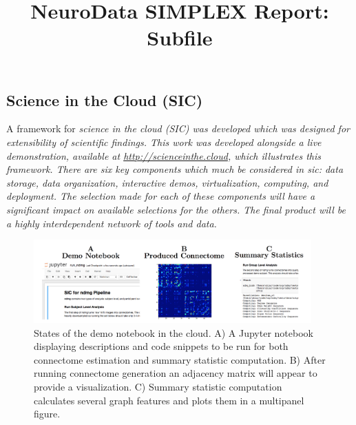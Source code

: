 \documentclass[simplex.tex]{subfiles}
\title{NeuroData SIMPLEX Report: Subfile}
\begin{document}

\subsection{Science in the Cloud (SIC)}

A framework for \itshape{science in the cloud} (SIC) was developed which was
designed for extensibility of scientific findings. This work was
developed alongside a live demonstration, available at
\href{http://scienceinthe.cloud}{http://scienceinthe.cloud}, which illustrates this framework. There are
six key components which much be considered in sic: data storage, data
organization, interactive demos, virtualization, computing, and
deployment. The selection made for each of these components will have a
significant impact on available selections for the others. The final
product will be a highly interdependent network of tools and data.

\begin{figure}[h!]
\begin{cframed}
\centering
\includegraphics[width=0.95\textwidth]{./figs/sic.png}
\caption{
  States of the demo notebook in the cloud. A) A Jupyter notebook
  displaying descriptions and code snippets to be run for both
  connectome estimation and summary statistic computation. B) After
  running connectome generation an adjacency matrix will appear to
  provide a visualization. C) Summary statistic computation calculates
  several graph features and plots them in a multipanel figure. 
}
\label{fig:sic}
\end{cframed}
\end{figure}
\end{document}
